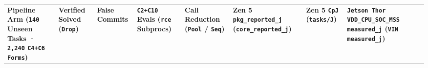 \documentclass[10pt,letterpaper]{article}
\begin{document}
{\scriptsize\setlength{\tabcolsep}{2.2pt}\renewcommand{\arraystretch}{1.14}
\begin{longtable}[]{@{}
  >{\raggedright\arraybackslash}p{}
  >{\centering\arraybackslash}p{}
  >{\centering\arraybackslash}p{}
  >{\raggedleft\arraybackslash}p{}
  >{\centering\arraybackslash}p{}
  >{\raggedleft\arraybackslash}p{}
  >{\raggedleft\arraybackslash}p{}
  >{\raggedleft\arraybackslash}p{}
  >{\raggedleft\arraybackslash}p{}@{}}
\toprule\noalign{}
\begin{minipage}[b]{\linewidth}\raggedright
\textbf{Pipeline Arm (\texttt{140} Unseen Tasks · \texttt{2,240}
\texttt{C4+C6} \texttt{Forms})}
\end{minipage} & \begin{minipage}[b]{\linewidth}\centering
\textbf{Verified Solved (\texttt{Drop})}
\end{minipage} & \begin{minipage}[b]{\linewidth}\centering
\textbf{False Commits}
\end{minipage} & \begin{minipage}[b]{\linewidth}\raggedleft
\textbf{\texttt{C2+C10} Evals (\texttt{rce} Subprocs)}
\end{minipage} & \begin{minipage}[b]{\linewidth}\centering
\textbf{Call Reduction (\texttt{Pool} / \texttt{Seq})}
\end{minipage} & \begin{minipage}[b]{\linewidth}\raggedleft
\textbf{Zen 5 \texttt{pkg\_\allowbreak{}reported\_\allowbreak{}j}
(\texttt{core\_\allowbreak{}reported\_\allowbreak{}j})}
\end{minipage} & \begin{minipage}[b]{\linewidth}\raggedleft
\textbf{Zen 5 \texttt{CpJ} (\texttt{tasks/J})}
\end{minipage} & \begin{minipage}[b]{\linewidth}\raggedleft
\textbf{\texttt{Jetson\ Thor} \texttt{VDD\_\allowbreak{}CPU\_\allowbreak{}SOC\_\allowbreak{}MSS}
\texttt{measured\_\allowbreak{}j} (\texttt{VIN} \texttt{measured\_\allowbreak{}j})}
\end{minipage} & \begin{minipage}[b]{\linewidth}\raggedleft

\end{minipage}
\end{longtable}}
\end{document}
